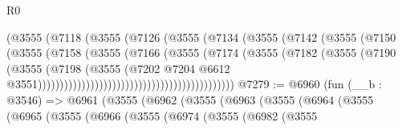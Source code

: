 \begin{lexlean}{R0}
\begin{coremodule}
                                              (@3555
                                                (@7118
                                                  (@3555
                                                    (@7126
                                                      (@3555
                                                        (@7134
                                                          (@3555
                                                            (@7142
                                                              (@3555
                                                                (@7150
                                                                  (@3555
                                                                    (@7158
                                                                      (@3555
                                                                        (@7166
                                                                          (@3555
                                                                            (@7174
                                                                              (@3555
                                                                                (@7182
                                                                                  (@3555
                                                                                    (@7190
                                                                                      (@3555
                                                                                        (@7198
                                                                                          (@3555
                                                                                            (@7202
                                                                                              @7204
                                                                                              @6612
                                                                                              @3551)))))))))))))))))))))))))))))))))))))))))))))
@7279 := @6960
    (fun (__b : @3546) =>
    @6961
      (@3555
        (@6962
          (@3555
            (@6963
              (@3555
                (@6964
                  (@3555
                    (@6965
                      (@3555
                        (@6966
                          (@3555
                            (@6974
                              (@3555
                                (@6982
                                  (@3555

\end{coremodule}
\end{lexlean}
